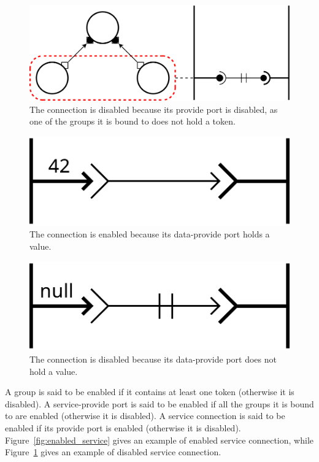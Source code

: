 \begin{figure}[t]
\begin{center}
  \includegraphics[width=0.7\columnwidth]{./images/disabled_service.pdf}
\end{center}
\caption{The connection is disabled because its provide port is disabled, as one of the groups it is bound to does not hold a token.}
\label{fig:disabled_service}
\end{figure}

\begin{figure}[t]
\begin{center}
  \includegraphics[width=0.4\columnwidth]{./images/enabled_data.pdf}
\end{center}
\caption{The connection is enabled because its data-provide port holds a value.}
\label{fig:enabled_data}
\end{figure}

\begin{figure}[t]
\begin{center}
  \includegraphics[width=0.4\columnwidth]{./images/disabled_data.pdf}
\end{center}
\caption{The connection is disabled because its data-provide port does not hold a value.}
\label{fig:disabled_data}
\end{figure}




A group is said to be enabled if it contains at least one token (otherwise
it is disabled). A service-provide port is said to be enabled if all the groups it
is bound to are enabled (otherwise it is disabled). A service connection is said to
be enabled if its provide port is enabled (otherwise it is disabled).
Figure~\ref{fig:enabled_service} gives an example of enabled service connection,
while Figure~\ref{fig:disabled_service} gives an example of disabled service connection.

